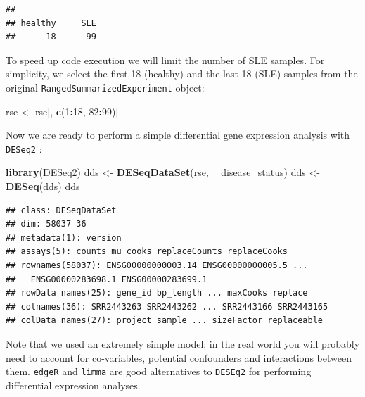 \documentclass[9pt,a4paper,]{extarticle}
\newenvironment{Shaded}{\begin{snugshade}}{\end{snugshade}}
\newcommand{\KeywordTok}[1]{\textcolor[rgb]{0.13,0.29,0.53}{\textbf{#1}}}
\newcommand{\DecValTok}[1]{\textcolor[rgb]{0.00,0.00,0.81}{#1}}
\newcommand{\StringTok}[1]{\textcolor[rgb]{0.31,0.60,0.02}{#1}}
\newcommand{\OperatorTok}[1]{\textcolor[rgb]{0.81,0.36,0.00}{\textbf{#1}}}
\newcommand{\NormalTok}[1]{#1}
\begin{document}
\begin{Shaded}
\end{Shaded}

\begin{verbatim}
## 
## healthy     SLE 
##      18      99
\end{verbatim}

To speed up code execution we will limit the number of SLE samples.
For simplicity, we select the first 18 (healthy) and the last 18 (SLE) samples from the original \texttt{RangedSummarizedExperiment} object:

\begin{Shaded}
\begin{Highlighting}[]
\NormalTok{rse <-}\StringTok{ }\NormalTok{rse[, }\KeywordTok{c}\NormalTok{(}\DecValTok{1}\OperatorTok{:}\DecValTok{18}\NormalTok{, }\DecValTok{82}\OperatorTok{:}\DecValTok{99}\NormalTok{)]}
\end{Highlighting}
\end{Shaded}

Now we are ready to perform a simple differential gene expression analysis with \texttt{DESeq2} \citep{Love2014}:

\begin{Shaded}
\begin{Highlighting}[]
\KeywordTok{library}\NormalTok{(DESeq2)}
\NormalTok{dds <-}\StringTok{ }\KeywordTok{DESeqDataSet}\NormalTok{(rse, }\OperatorTok{~}\StringTok{ }\NormalTok{disease_status)}
\NormalTok{dds <-}\StringTok{ }\KeywordTok{DESeq}\NormalTok{(dds)}
\NormalTok{dds}
\end{Highlighting}
\end{Shaded}

\begin{verbatim}
## class: DESeqDataSet 
## dim: 58037 36 
## metadata(1): version
## assays(5): counts mu cooks replaceCounts replaceCooks
## rownames(58037): ENSG00000000003.14 ENSG00000000005.5 ...
##   ENSG00000283698.1 ENSG00000283699.1
## rowData names(25): gene_id bp_length ... maxCooks replace
## colnames(36): SRR2443263 SRR2443262 ... SRR2443166 SRR2443165
## colData names(27): project sample ... sizeFactor replaceable
\end{verbatim}

Note that we used an extremely simple model; in the real world you will probably need to account for co-variables, potential confounders and interactions between them.
\texttt{edgeR} \citep{Robinson2010} and \texttt{limma} \citep{Ritchie2015} are good alternatives to \texttt{DESEq2} for performing differential expression analyses.
\end{document}
